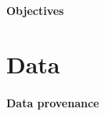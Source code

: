 \documentclass[11pt,a4paper]{article}
\begin{document}

\paragraph{Objectives}


\section{Data}

\paragraph{Data provenance}

% 


%
\end{document}
